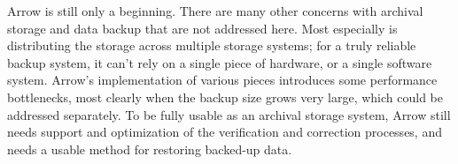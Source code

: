 \documentclass{article}
\begin{document}
Arrow is still only a beginning. There are many other concerns with
archival storage and data backup that are not addressed here. Most
especially is distributing the storage across multiple storage
systems; for a truly reliable backup system, it can't rely on a single
piece of hardware, or a single software system. Arrow's implementation
of various pieces introduces some performance bottlenecks, most
clearly when the backup size grows very large, which could be
addressed separately. To be fully usable as an archival storage
system, Arrow still needs support and optimization of the verification
and correction processes, and needs a usable method for restoring
backed-up data.










\end{document}
